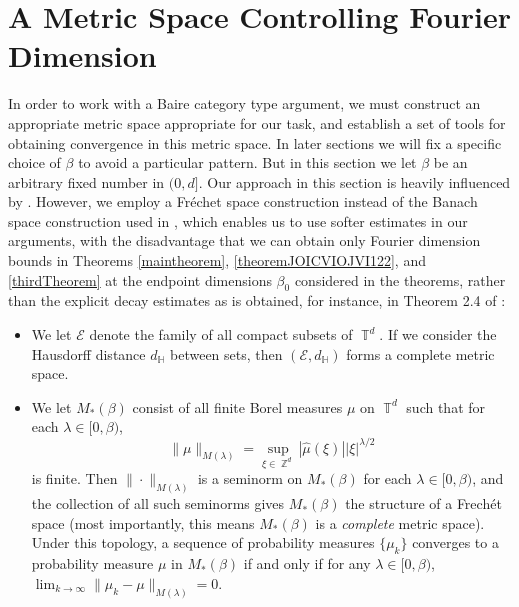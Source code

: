 \documentclass[dvipsnames,letterpaper,12pt]{article}
\numberwithin{equation}{section}
\DeclareMathOperator{\ZZ}{\mathbb{Z}}
\DeclareMathOperator{\TT}{\mathbb{T}}
\numberwithin{theorem}{section}
\begin{document}
\section{A Metric Space Controlling Fourier Dimension}

In order to work with a Baire category type argument, we must construct an appropriate metric space appropriate for our task, and establish a set of tools for obtaining convergence in this metric space. In later sections we will fix a specific choice of $\beta$ to avoid a particular pattern. But in this section we let $\beta$ be an arbitrary fixed number in $(0,d]$. Our approach in this section is heavily influenced by \cite{Korner2}. However, we employ a Fr\'{e}chet space construction instead of the Banach space construction used in \cite{Korner2}, which enables us to use softer estimates in our arguments, with the disadvantage that we can obtain only Fourier dimension bounds in Theorems \ref{maintheorem}, \ref{theoremJOICVIOJVI122}, and \ref{thirdTheorem} at the endpoint dimensions $\beta_0$ considered in the theorems, rather than the explicit decay estimates as is obtained, for instance, in Theorem 2.4 of \cite{Korner2}:
%
\begin{itemize}
    \item We let $\mathcal{E}$ denote the family of all compact subsets of $\TT^d$. If we consider the Hausdorff distance $d_{\mathbb{H}}$ between sets, then $(\mathcal{E},d_\mathbb{H})$ forms a complete metric space. %

    \item We let $M_*(\beta)$ consist of all finite Borel measures $\mu$ on $\TT^d$ such that for each $\lambda \in [0,\beta)$,
    \[ \| \mu \|_{M(\lambda)} = \sup_{\xi \in \ZZ^d} |\widehat{\mu}(\xi)| |\xi|^{\lambda/2} \]
    is finite. Then $\| \cdot \|_{M(\lambda)}$ is a seminorm on $M_*(\beta)$ for each $\lambda \in [0,\beta)$, and the collection of all such seminorms gives $M_*(\beta)$ the structure of a Frech\'{e}t space (most importantly, this means $M_*(\beta)$ is a \emph{complete} metric space). Under this topology, a sequence of probability measures $\{ \mu_k \}$ converges to a probability measure $\mu$ in $M_*(\beta)$ if and only if for any $\lambda \in [0,\beta)$, $\lim_{k \to \infty} \| \mu_k - \mu \|_{M(\lambda)} = 0$.
\end{itemize}
\end{document}

